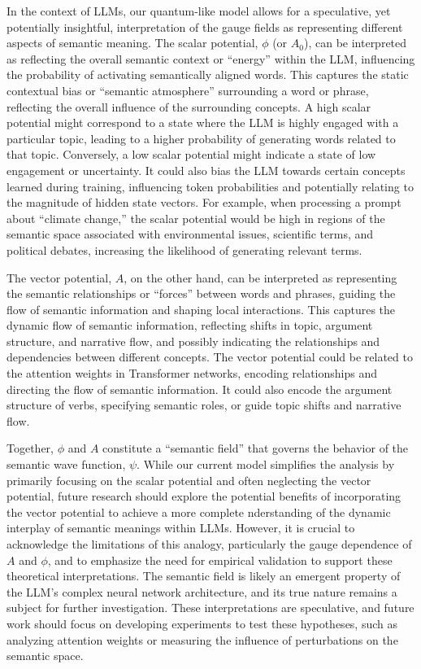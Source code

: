 \documentclass[prd,amsmath,amssymb,12pt]{revtex4}
\begin{document}
In the context of LLMs, our quantum-like model allows for a speculative, yet potentially insightful,
interpretation of the gauge fields as representing different aspects of semantic meaning. The scalar potential,
$\phi$ (or $A_0$), can be interpreted as reflecting the overall semantic context or ``energy'' within the LLM,
influencing the probability of activating semantically aligned words. This captures the static contextual
bias or ``semantic atmosphere'' surrounding a word or phrase, reflecting the overall influence of the
surrounding concepts. A high scalar potential might correspond to a state where the LLM is highly engaged
with a particular topic, leading to a higher probability of generating words related to that topic.
Conversely, a low scalar potential might indicate a state of low engagement or uncertainty. It could
also bias the LLM towards certain concepts learned during training, influencing token probabilities
and potentially relating to the magnitude of hidden state vectors. For example, when processing a
prompt about ``climate change,'' the scalar potential would be high in regions of the semantic space
associated with environmental issues, scientific terms, and political debates, increasing the likelihood
of generating relevant terms.

The vector potential, $A$, on the other hand, can be interpreted as representing the semantic
relationships or ``forces'' between words and phrases, guiding the flow of semantic information and
shaping local interactions. This captures the dynamic flow of semantic information, reflecting
shifts in topic, argument structure, and narrative flow, and possibly indicating the relationships
and dependencies between different concepts. The vector potential could be related to the attention
weights in Transformer networks, encoding relationships and directing the flow of semantic
information. It could also encode the argument structure of verbs, specifying semantic roles,
or guide topic shifts and narrative flow.

Together, $\phi$ and $A$ constitute a ``semantic field'' that governs the behavior of the semantic
wave function, $\psi$. While our current model simplifies the analysis by primarily focusing on
the scalar potential and often neglecting the vector potential, future research should explore
the potential benefits of incorporating the vector potential to achieve a more complete
nderstanding of the dynamic interplay of semantic meanings within LLMs. However, it is crucial
to acknowledge the limitations of this analogy, particularly the gauge dependence of $A$ and
$\phi$, and to emphasize the need for empirical validation to support these theoretical
interpretations. The semantic field is likely an emergent property of the LLM's complex neural
network architecture, and its true nature remains a subject for further investigation. These
interpretations are speculative, and future work should focus on developing experiments to test
these hypotheses, such as analyzing attention weights or measuring the influence of perturbations
on the semantic space.
\end{document}
